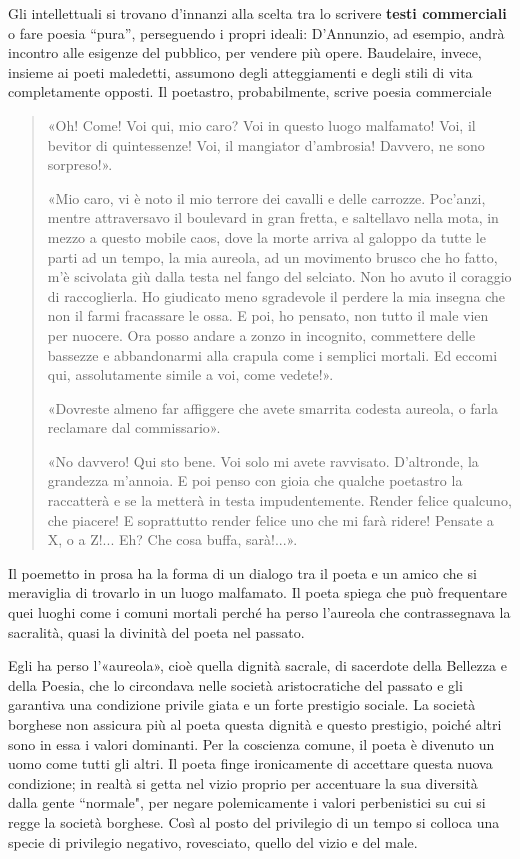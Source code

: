 \documentclass{book}
\newcommand{\evidenziatore}[1]{\textbf{#1}}
\newcounter{mar}
\begin{document}
Gli intellettuali si trovano d'innanzi alla scelta tra lo scrivere
\evidenziatore{testi commerciali} o fare poesia ``pura'', perseguendo i
propri ideali: D'Annunzio, ad esempio, andrà incontro alle esigenze del
pubblico, per vendere più opere. Baudelaire, invece, insieme ai poeti
maledetti, assumono degli atteggiamenti e degli stili di vita
completamente opposti. Il poetastro, probabilmente, scrive poesia
commerciale

\begin{quote}
«Oh! Come! Voi qui, mio caro? Voi in questo luogo malfamato! Voi, il bevitor di
quintessenze! Voi, il mangiator d'ambrosia! Davvero, ne sono sorpreso!».

«Mio caro, vi è noto il mio terrore dei cavalli e delle carrozze. Poc'anzi, mentre
attraversavo il boulevard in gran fretta, e saltellavo nella mota, in mezzo a 
questo mobile caos, dove la morte arriva al galoppo da tutte le parti ad un
tempo, la mia aureola, ad un movimento brusco che ho fatto, m'è scivolata
giù dalla testa nel fango del selciato. Non ho avuto il coraggio di raccoglierla.
Ho giudicato meno sgradevole il perdere la mia insegna che non il farmi
fracassare le ossa. E poi, ho pensato, non tutto il male vien per nuocere. Ora
posso andare a zonzo in incognito, commettere delle bassezze e abbandonarmi
alla crapula come i semplici mortali. Ed eccomi qui, assolutamente simile a
voi, come vedete!».

«Dovreste almeno far affiggere che avete smarrita codesta aureola, o farla
reclamare dal commissario».

«No davvero! Qui sto bene. Voi solo mi avete ravvisato. D'altronde, la
grandezza m'annoia. E poi penso con gioia che qualche poetastro la raccatterà
e se la metterà in testa impudentemente. Render felice qualcuno, che piacere!
E soprattutto render felice uno che mi farà ridere! Pensate a X, o a Z!... Eh?
Che cosa buffa, sarà!...». 
\end{quote}

Il poemetto in prosa ha la forma di un dialogo tra il poeta e un amico che si meraviglia di trovarlo in un luogo malfamato. Il poeta spiega che può frequentare quei luoghi come i comuni mortali perché ha perso l'aureola che contrassegnava la sacralità, quasi la divinità del poeta nel passato.

Egli ha perso l'«aureola», cioè quella dignità sacrale, di sacerdote della Bellezza e della Poesia, che lo circondava nelle società aristocratiche del passato e gli garantiva una condizione privile giata e un forte prestigio sociale. La società borghese non assicura più al poeta questa dignità e questo prestigio, poiché altri sono in essa i valori dominanti. Per la coscienza comune, il poeta è divenuto un uomo come tutti gli altri. Il poeta finge ironicamente di accettare questa nuova condizione; in realtà si getta nel vizio proprio per accentuare la sua diversità dalla gente “normale", per negare polemicamente i valori perbenistici su cui si regge la società borghese. Così al posto del privilegio di un tempo si colloca una specie di privilegio negativo, rovesciato, quello del vizio e del male.
\end{document}
